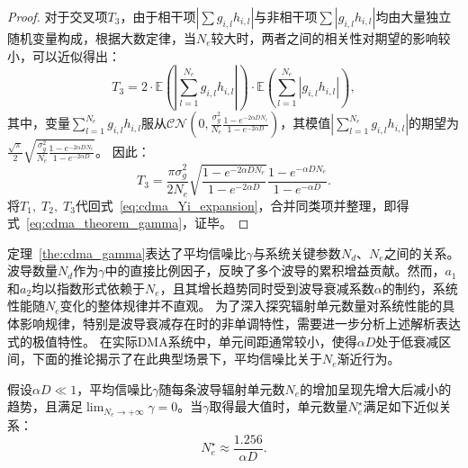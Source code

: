 \begin{proof}
	对于交叉项$T_3$，由于相干项$\left| \sum g_{i,l} h_{i,l} \right|$与非相干项$\sum |g_{i,l} h_{i,l}|$均由大量独立随机变量构成，根据大数定律，当$N_e$较大时，两者之间的相关性对期望的影响较小，可以近似得出：
	\begin{equation}
		T_3 = 2 \cdot \mathbb{E}\left( \left| \sum_{l=1}^{N_e} g_{i,l} h_{i,l} \right| \right) \cdot \mathbb{E}\left( \sum_{l=1}^{N_e} |g_{i,l} h_{i,l}| \right),
	\end{equation}
	其中，变量$\sum_{l=1}^{N_e} g_{i,l} h_{i,l}$服从$\mathcal{CN}(0, \frac{\sigma_g^2}{N_e} \frac{1 - e^{-2\alpha D N_e}}{1 - e^{-2\alpha D}})$，其模值$|\sum_{l=1}^{N_e} g_{i,l} h_{i,l}|$的期望为$\frac{\sqrt{\pi}}{2} \sqrt{\frac{\sigma_g^2}{N_e} \frac{1 - e^{-2\alpha D N_e}}{1 - e^{-2\alpha D}}}$。
	因此：
	\begin{equation}
		T_3 =
		\frac{\pi \sigma_g^2}{2N_e} \sqrt{\frac{1 - e^{-2\alpha D N_e}}{1 - e^{-2\alpha D}}} \frac{1 - e^{-\alpha D N_e}}{1 - e^{-\alpha D}}.
	\end{equation}
	将$T_1,\;T_2,\;T_3$代回式~\eqref{eq:cdma_Yi_expansion}，合并同类项并整理，即得式~\eqref{eq:cdma_theorem_gamma}，证毕。
\end{proof}

定理~\ref{the:cdma_gamma}表达了平均信噪比$\gamma$与系统关键参数$N_d$、$N_e$之间的关系。波导数量$N_d$作为$\gamma$中的直接比例因子，反映了多个波导的累积增益贡献。然而，$a_1$和$a_2$均以指数形式依赖于$N_e$，且其增长趋势同时受到波导衰减系数$\alpha$的制约，系统性能随$N_e$变化的整体规律并不直观。
为了深入探究辐射单元数量对系统性能的具体影响规律，特别是波导衰减存在时的非单调特性，需要进一步分析上述解析表达式的极值特性。
在实际DMA系统中，单元间距通常较小，使得$\alpha D$处于低衰减区间，下面的推论揭示了在此典型场景下，平均信噪比关于$N_e$渐近行为。

\begin{corollary}\label{cor:cdma_Ne_opt}
	假设$\alpha D \ll 1$，平均信噪比$\gamma$随每条波导辐射单元数$N_e$的增加呈现先增大后减小的趋势，且满足$\lim_{N_e\to +\infty}\gamma=0$。当$\gamma$取得最大值时，单元数量$N_e^\star$满足如下近似关系：
	\begin{equation}\label{eq:cdma_Ne_opt}
		N_e^\star \approx \frac{1.256}{\alpha D}.
	\end{equation}
\end{corollary}

